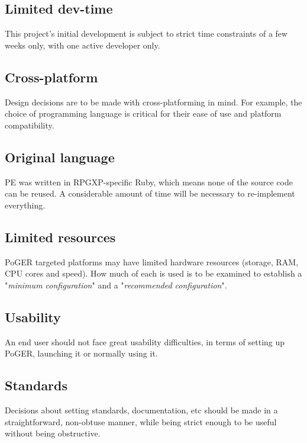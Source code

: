 \documentclass[11pt]{article}
\begin{document}
\subsection{Limited dev-time}

This project's initial development is subject to strict time constraints of a few weeks only, with one active developer only.

\subsection{Cross-platform}

Design decisions are to be made with cross-platforming in mind. For example, the choice of programming language is critical for their ease of use and platform compatibility.

\subsection{Original language}

PE was written in RPGXP-specific Ruby, which means none of the source code can be reused. A considerable amount of time will be necessary to re-implement everything.

\subsection{Limited resources}

PoGER targeted platforms may have limited hardware resources (storage, RAM, CPU cores and speed). How much of each is used is to be examined to establish a "\textit{minimum configuration}" and a "\textit{recommended configuration}".

\subsection{Usability}

An end user should not face great usability difficulties, in terms of setting up PoGER, launching it or normally using it.

\subsection{Standards}

Decisions about setting standards, documentation, etc should be made in a straightforward, non-obtuse manner, while being strict enough to be useful without being obstructive.
\end{document}
